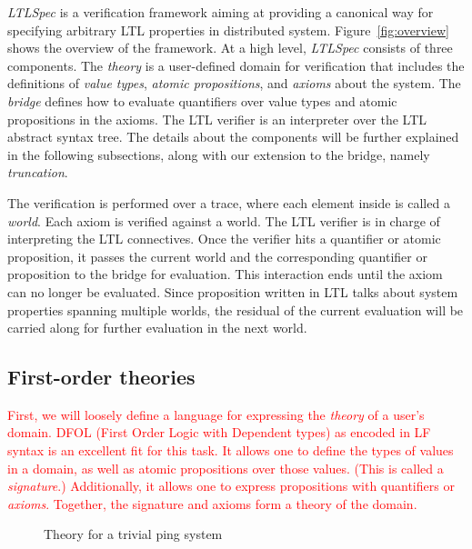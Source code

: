 \documentclass[format=acmsmall, nonacm=true, review=true, screen=true]{acmart}
\newcommand{\mycaption}[1]{\Description{#1}\caption{#1}}
\newcommand{\ltlspec}{\textit{LTLSpec}\xspace}
\newcommand{\red}[1]{\textcolor{red}{#1}}
\begin{document}
\ltlspec is a verification framework aiming at providing a canonical way for specifying arbitrary LTL properties in distributed system.
Figure~\ref{fig:overview} shows the overview of the framework.
At a high level, \ltlspec consists of three components.
The \textit{theory} is a user-defined domain for verification that includes the definitions of \textit{value types}, \textit{atomic propositions}, and \textit{axioms} about the system.
The \textit{bridge} defines how to evaluate quantifiers over value types and atomic propositions in the axioms.
The LTL verifier is an interpreter over the LTL abstract syntax tree.
The details about the components will be further explained in the following subsections, along with our extension to the bridge, namely \textit{truncation}.

The verification is performed over a trace, where each element inside is called a \textit{world}.
Each axiom is verified against a world. The LTL verifier is in charge of interpreting the LTL connectives.
Once the verifier hits a quantifier or atomic proposition, it passes the current world and the corresponding quantifier or proposition to the bridge for evaluation.
This interaction ends until the axiom can no longer be evaluated.
Since proposition written in LTL talks about system properties spanning multiple worlds, the residual of the current evaluation will be carried along for further evaluation in the next world.


\subsection{First-order theories}

\red{
  First, we will loosely define a language for expressing the \textit{theory} of a user’s domain.
  DFOL (First Order Logic with Dependent types) as encoded in LF syntax \cite{hutchison_first-order_2006} is an excellent fit for this task. It allows one to define the types of values in a domain, as well as atomic propositions over those values. (This is called a \textit{signature}.)
  Additionally, it allows one to express propositions with quantifiers or \textit{axioms}. Together, the signature and axioms form a theory of the domain.
}

\begin{figure}[h]
  {
    \fontsize{10}{12}\selectfont
    
  }
  \mycaption{Theory for a trivial ping system}
  \label{fig:ping-theory}
\end{figure}
\end{document}
